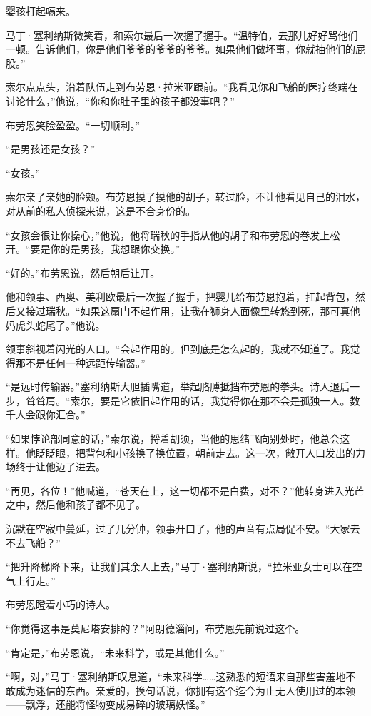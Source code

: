 \documentclass[AutoFakeBold=true]{book}
\begin{document}
婴孩打起嗝来。

马丁·塞利纳斯微笑着，和索尔最后一次握了握手。``温特伯，去那儿好好骂他们一顿。告诉他们，你是他们爷爷的爷爷的爷爷。如果他们做坏事，你就抽他们的屁股。''

索尔点点头，沿着队伍走到布劳恩·拉米亚跟前。``我看见你和飞船的医疗终端在讨论什么，''他说，``你和你肚子里的孩子都没事吧？''

布劳恩笑脸盈盈。``一切顺利。''

``是男孩还是女孩？''

``女孩。''

索尔亲了亲她的脸颊。布劳恩摸了摸他的胡子，转过脸，不让他看见自己的泪水，对从前的私人侦探来说，这是不合身份的。

``女孩会很让你操心，''他说，他将瑞秋的手指从他的胡子和布劳恩的卷发上松开。``要是你的是男孩，我想跟你交换。''

``好的。''布劳恩说，然后朝后让开。

他和领事、西奥、美利欧最后一次握了握手，把婴儿给布劳恩抱着，扛起背包，然后又接过瑞秋。``如果这扇门不起作用，让我在狮身人面像里转悠到死，那可真他妈虎头蛇尾了。''他说。

领事斜视着闪光的人口。``会起作用的。但到底是怎么起的，我就不知道了。我觉得那不是任何一种远距传输器。''

``是远时传输器。''塞利纳斯大胆插嘴道，举起胳膊抵挡布劳恩的拳头。诗人退后一步，耸耸肩。``索尔，要是它依旧起作用的话，我觉得你在那不会是孤独一人。数千人会跟你汇合。''

``如果悖论部同意的话，''索尔说，捋着胡须，当他的思绪飞向别处时，他总会这样。他眨眨眼，把背包和小孩换了换位置，朝前走去。这一次，敞开人口发出的力场终于让他迈了进去。

``再见，各位！''他喊道，``苍天在上，这一切都不是白费，对不？''他转身进入光芒之中，然后他和孩子都不见了。

\vspace*{1em}

沉默在空寂中蔓延，过了几分钟，领事开口了，他的声音有点局促不安。``大家去不去飞船？''

``把升降梯降下来，让我们其余人上去，''马丁·塞利纳斯说，``拉米亚女士可以在空气上行走。''

布劳恩瞪着小巧的诗人。

``你觉得这事是莫尼塔安排的？''阿朗德淄问，布劳恩先前说过这个。

``肯定是，''布劳恩说，``未来科学，或是其他什么。''

``啊，对，''马丁·塞利纳斯叹息道，``未来科学……这熟悉的短语来自那些害羞地不敢成为迷信的东西。亲爱的，换句话说，你拥有这个迄今为止无人使用过的本领——飘浮，还能将怪物变成易碎的玻璃妖怪。''
\end{document}
